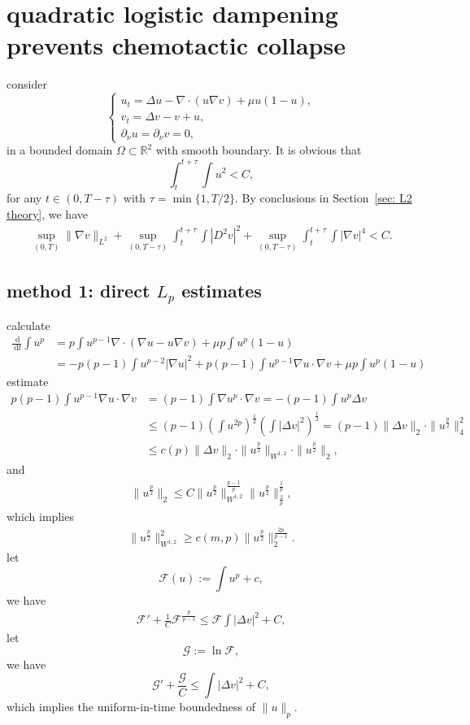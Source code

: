 \documentclass[en,hazy,screen,blue,14pt]{elegantnote}
\numberwithin{dummy}{section}
\newcommand{\dd}{\;\mathrm{d}}
\begin{document}
\section{quadratic logistic dampening prevents chemotactic collapse}

consider 
\begin{equation}
	\begin{cases}
		u_t = \Delta u - \nabla\cdot(u\nabla v) + \mu u (1-u), \\
		v_t = \Delta v - v + u,\\
		\partial_\nu u = \partial_\nu v = 0,
	\end{cases}
\end{equation}
in a bounded domain $\Omega\subset\mathbb{R}^2$ with smooth boundary.
It is obvious that
\[
	\int_t^{t+\tau}\int u^2 < C,
\]
for any $t\in(0, T-\tau)$ with $\tau = \min\{1, T/2\}$.
By conclusions in Section~\ref{sec: L2 theory}, 
we have 
\begin{align*}
	\sup_{(0,T)}\|\nabla v\|_{L^2} 
	+ \sup_{(0,T-\tau)}\int_t^{t+\tau}\int |D^2v|^2 
	+ \sup_{(0, T-\tau)}\int_t^{t+\tau}\int |\nabla v|^4 < C.
\end{align*}


\subsection{method 1: direct \texorpdfstring{$L_p$}{Lp} estimates}
calculate
\begin{align*}
	\frac{\dd}{\dd t}\int u^p 
	&= p\int u^{p-1}\nabla\cdot(\nabla u - u\nabla v) + \mu p \int u^p(1-u)\\
	&= - p(p-1)\int u^{p-2}|\nabla u|^2 
		+ p(p-1) \int u^{p-1}\nabla u\cdot\nabla v 
		+ \mu p\int u^p(1-u)
\end{align*}
estimate
\begin{align*}
	p(p-1) \int u^{p-1}\nabla u\cdot\nabla v
	&= (p-1)\int \nabla u^p\cdot\nabla v
	 = -(p-1)\int u^p\Delta v\\
	&\leq (p-1)\left(\int u^{2p}\right)^{\frac12}\left(\int |\Delta v|^2\right)^\frac{1}{2}
	 = (p-1)\|\Delta v\|_2\cdot\|u^{\frac{p}{2}}\|_4^2\\
	&\leq c(p) \|\Delta v\|_2\cdot \|u^{\frac{p}{2}}\|_{W^{1,2}}\cdot\|u^{\frac{p}{2}}\|_2,
\end{align*}
and
\begin{align*}
	\|u^{\frac{p}{2}}\|_2 
	\leq C\|u^{\frac{p}{2}}\|_{W^{1,2}}^{\frac{p-1}{p}}\|u^{\frac{p}{2}}\|_{\frac2p}^{\frac1p},
\end{align*}
which implies 
\begin{align*}
	\|u^{\frac{p}{2}}\|_{W^{1,2}}^2 \geq c(m,p) \|u^{\frac{p}{2}}\|_2^{\frac{2p}{p-1}}.
\end{align*}
let 
\[
	\mathcal{F}(u) := \int u^p + c,
\]
we have
\begin{align*}
	\mathcal{F}' + \frac1C\mathcal{F}^\frac{p}{p-1} 
	\leq \mathcal{F} \int |\Delta v|^2 + C,
\end{align*}
let
\[
	\mathcal{G} := \ln\mathcal{F},
\]
we have 
\begin{equation*}
	\mathcal{G}' + \frac{\mathcal{G}}{C} \leq \int|\Delta v|^2 + C,
\end{equation*}
which implies the uniform-in-time boundedness of $\|u\|_p$.
\end{document}
